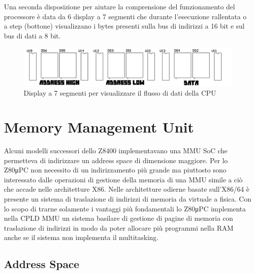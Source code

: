 \documentclass[a4paper, 11pt, twoside]{article}
\newcommand{\prj}{Z80μPC\xspace}
\begin{document}
Una seconda disposizione per aiutare la comprensione del funzionamento del
processore \`e data da 6 display a 7 segmenti che durante l'esecuzione
rallentata o a step (bottone) visualizzano i bytes presenti sulla bus di
indirizzi a 16 bit e sul bus di dati a 8 bit.

\begin{figure}[!h] \centering
    \includegraphics[width=\linewidth]{res/bus_displays}
    \caption{Display a 7 segmenti per visualizzare il flusso di dati della
    CPU}
\end{figure}

\section{Memory Management Unit}

Alcuni modelli successori dello Z8400 implementavano una MMU SoC che
permetteva di indirizzare un address space di dimensione maggiore. Per lo \prj
non necessito di un indirizzamento pi\`u grande ma piuttosto sono interessato
dalle operazioni di gestione della memoria di una MMU simile a ci\`o che
accade nelle architetture X86. Nelle architetture odierne basate sull'X86/64
\`e presente un sistema di traslazione di indirizzi di memoria da virtuale a
fisica. Con lo scopo di trarne solamente i vantaggi pi\`u fondamentali lo \prj
implementa nella CPLD MMU un sistema basilare di gestione di pagine di memoria
con traslazione di indirizzi in modo da poter allocare pi\`u programmi nella
RAM anche se il sistema non implementa il multitasking.


\subsection{Address Space}
\end{document}
